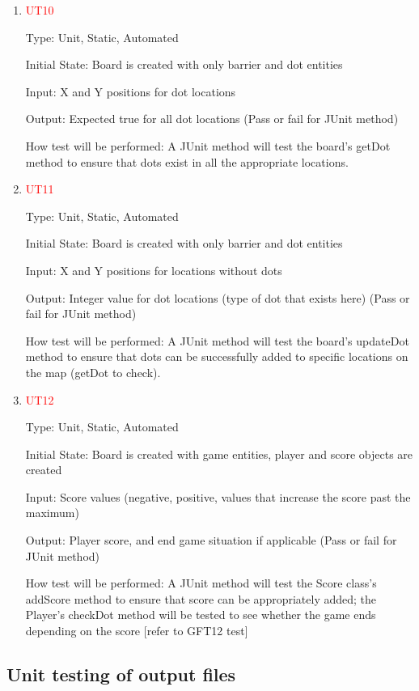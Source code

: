 \documentclass[12pt, titlepage]{article}
\begin{document}
\begin{enumerate}
\item{\textcolor{red}{UT10}\\}

Type: Unit, Static, Automated
					
Initial State: Board is created with only barrier and dot entities
					
Input: X and Y positions for dot locations
					
Output: Expected true for all dot locations (Pass or fail for JUnit method)
					
How test will be performed: A JUnit method will test the board's getDot method to ensure that dots exist in all the appropriate locations.

\item{\textcolor{red}{UT11}\\}

Type: Unit, Static, Automated
					
Initial State: Board is created with only barrier and dot entities
					
Input: X and Y positions for locations without dots
					
Output: Integer value for dot locations (type of dot that exists here) (Pass or fail for JUnit method)
					
How test will be performed: A JUnit method will test the board's updateDot method to ensure that dots can be successfully added to specific locations on the map (getDot to check).

\item{\textcolor{red}{UT12}\\}

Type: Unit, Static, Automated
					
Initial State: Board is created with game entities, player and score objects are created
					
Input: Score values (negative, positive, values that increase the score past the maximum)
					
Output: Player score, and end game situation if applicable (Pass or fail for JUnit method)
					
How test will be performed: A JUnit method will test the Score class's addScore method to ensure that score can be appropriately added; the Player's checkDot method will be tested to see whether the game ends depending on the score [refer to GFT12 test]

\end{enumerate}
		
\subsection{Unit testing of output files}	
\end{document}
